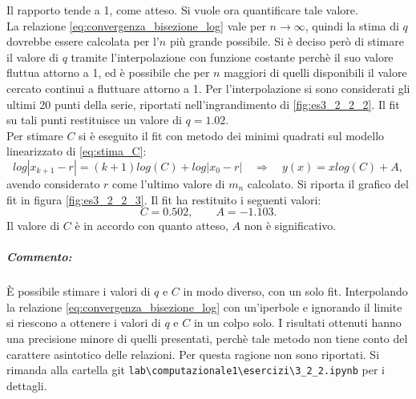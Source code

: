 \documentclass[letterpaper, 12pt]{article}
\numberwithin{equation}{section}    %
\begin{document}
Il rapporto tende a 1, come atteso. Si vuole ora quantificare tale valore. \\
La relazione \ref{eq:convergenza_bisezione_log} vale per $n\to\infty$, quindi la stima di $q$
dovrebbe essere calcolata per l'$n$ più grande possibile. Si
è deciso però di stimare il valore di $q$ tramite l'interpolazione con funzione costante perchè il suo valore 
fluttua attorno a 1, ed è possibile che per $n$ maggiori di quelli disponibili il valore cercato continui a 
fluttuare attorno a 1. Per l'interpolazione si sono considerati gli ultimi 20 punti della serie, riportati 
nell'ingrandimento di \ref{fig:es3_2_2_2}. Il fit su tali punti restituisce
un valore di $q = 1.02$. \\  
Per stimare $C$ si è eseguito il fit con metodo dei minimi quadrati sul modello linearizzato di \ref{eq:stima_C}:
\begin{equation}
    log |x_{k+1}-r| = (k+1)log(C) + log|x_0 - r|  \quad \Rightarrow \quad  y(x) = x log(C) + A ,
\end{equation}
avendo considerato $r$ come l'ultimo valore di $m_n$ calcolato. Si riporta il grafico del fit in 
figura \ref{fig:es3_2_2_3}. Il fit ha restituito i seguenti valori:
\begin{equation*}
    C = 0.502,
    \qquad
    A = -1.103.
\end{equation*}
Il valore di $C$ è in accordo con quanto atteso, $A$ non è significativo.
\subparagraph{Commento:}È possibile stimare i valori di $q$ e $C$ in modo diverso, con un solo fit.
Interpolando la relazione \ref{eq:convergenza_bisezione_log} con un'iperbole e ignorando il limite 
si riescono a ottenere i valori di $q$ e $C$ in un colpo solo. I risultati ottenuti hanno una precisione minore 
di quelli presentati, perchè tale metodo non tiene conto
del carattere asintotico delle relazioni. Per questa ragione non sono riportati. Si rimanda alla cartella git
\verb|lab\computazionale1\esercizi\3_2_2.ipynb| per i dettagli.
\end{document}
